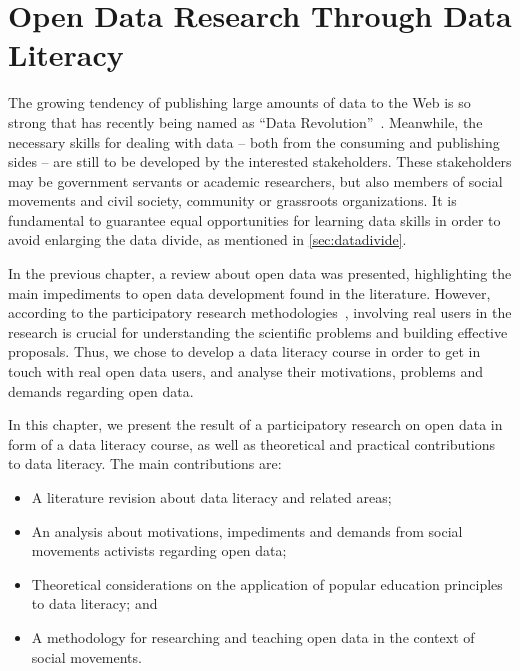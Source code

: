 
\chapter{Open Data Research Through Data Literacy}
\label{chap:dataliteracy}

The growing tendency of publishing large amounts of data to the Web is so strong that has recently being named as ``Data Revolution''~\cite{DataRevolutionGroup2014}.
Meanwhile, the necessary skills for dealing with data -- both from the consuming and publishing sides -- are still to be developed by the interested stakeholders.
These stakeholders may be government servants or academic researchers, but also members of social movements and civil society, community or grassroots organizations.
It is fundamental to guarantee equal opportunities for learning data skills in order to avoid enlarging the data divide, as mentioned in \autoref{sec:datadivide}.

In the previous chapter, a review about open data was presented, highlighting the main impediments to open data development found in the literature.
However, according to the participatory research methodologies~\cite{SCHULER1993,FalsBorda1991,Alvear2014}, involving real users in the research is crucial for understanding the scientific problems and building effective proposals.
Thus, we chose to develop a data literacy course in order to get in touch with real open data users, and analyse their motivations, problems and demands regarding open data.

In this chapter, we present the result of a participatory research on open data in form of a data literacy course, as well as theoretical and practical contributions to data literacy. 
The main contributions are:

\begin{itemize}
	\item A literature revision about data literacy and related areas;
	\item An analysis about motivations, impediments and demands from social movements activists regarding open data;
	\item Theoretical considerations on the application of popular education principles to data literacy; and
	\item A methodology for researching and teaching open data in the context of social movements.
\end{itemize}

